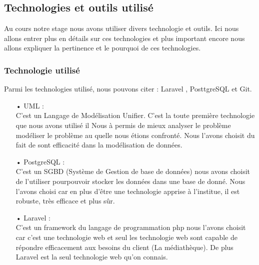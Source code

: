 \documentclass[12pt,a4paper]{article}
\begin{document}
\subsection{Technologies et outils utilisé}
Au cours notre stage nous avons utiliser divers technologie et outils. Ici nous allons 
entrer plus en détails sur ces technologies et plus important encore nous allons 
expliquer la pertinence et le pourquoi de ces technologies.\\
\subsubsection{Technologie utilisé}
Parmi les technologies utilisé, nous pouvons citer : Laravel , PosttgreSQL et Git.
\begin{itemize}
\item[•] UML : \\
C'est un Langage de Modélisation Unifier. C'est la toute première technologie que nous avons
utilisé il Nous à permis de mieux analyser le problème modéliser le problème au quelle
nous étions confronté. Nous l'avons choisit du fait de sont efficacité dans la modélisation
de données.
\item[•] PostgreSQL : \\
C'est un SGBD (Système de Gestion de base de données) nous avons choisit de l'utiliser
pourpouvoir stocker les données dans une base de donné. Nous l'avons choisi car en
plus d'être une technologie apprise à l'institue, il est robuste, très efficace et plus
sûr.
\item[•] Laravel : \\
C'est un framework du langage de programmation php nous l'avons choisit car c'est une
technologie web et seul les technologie web sont capable de répondre efficacement aux besoins du
client (La médiathèque). De plus Laravel est la seul technologie web qu'on connais.
\end{itemize}
\end{document}

